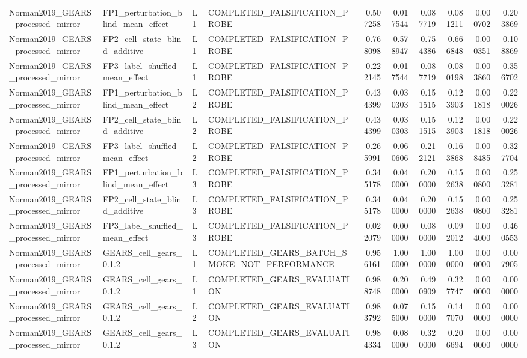 \begin{tabular}{llllrrrrrr}
Norman2019_GEARS_processed_mirror & FP1_perturbation_blind_mean_effect & L1 & COMPLETED_FALSIFICATION_PROBE & 0.507258 & 0.017544 & 0.087719 & 0.081211 & 0.000702 & 0.203869 \\
Norman2019_GEARS_processed_mirror & FP2_cell_state_blind_additive & L1 & COMPLETED_FALSIFICATION_PROBE & 0.768098 & 0.578947 & 0.754386 & 0.666848 & 0.000351 & 0.108869 \\
Norman2019_GEARS_processed_mirror & FP3_label_shuffled_mean_effect & L1 & COMPLETED_FALSIFICATION_PROBE & 0.222145 & 0.017544 & 0.087719 & 0.080198 & 0.003860 & 0.356702 \\
Norman2019_GEARS_processed_mirror & FP1_perturbation_blind_mean_effect & L2 & COMPLETED_FALSIFICATION_PROBE & 0.434399 & 0.030303 & 0.151515 & 0.123903 & 0.001818 & 0.220026 \\
Norman2019_GEARS_processed_mirror & FP2_cell_state_blind_additive & L2 & COMPLETED_FALSIFICATION_PROBE & 0.434399 & 0.030303 & 0.151515 & 0.123903 & 0.001818 & 0.220026 \\
Norman2019_GEARS_processed_mirror & FP3_label_shuffled_mean_effect & L2 & COMPLETED_FALSIFICATION_PROBE & 0.265991 & 0.060606 & 0.212121 & 0.163868 & 0.008485 & 0.327704 \\
Norman2019_GEARS_processed_mirror & FP1_perturbation_blind_mean_effect & L3 & COMPLETED_FALSIFICATION_PROBE & 0.345178 & 0.040000 & 0.200000 & 0.152638 & 0.000800 & 0.253281 \\
Norman2019_GEARS_processed_mirror & FP2_cell_state_blind_additive & L3 & COMPLETED_FALSIFICATION_PROBE & 0.345178 & 0.040000 & 0.200000 & 0.152638 & 0.000800 & 0.253281 \\
Norman2019_GEARS_processed_mirror & FP3_label_shuffled_mean_effect & L3 & COMPLETED_FALSIFICATION_PROBE & 0.022079 & 0.000000 & 0.080000 & 0.092012 & 0.004000 & 0.460553 \\
Norman2019_GEARS_processed_mirror & GEARS_cell_gears_0.1.2 & L1 & COMPLETED_GEARS_BATCH_SMOKE_NOT_PERFORMANCE & 0.956161 & 1.000000 & 1.000000 & 1.000000 & 0.000000 & 0.007905 \\
Norman2019_GEARS_processed_mirror & GEARS_cell_gears_0.1.2 & L1 & COMPLETED_GEARS_EVALUATION & 0.988748 & 0.200000 & 0.490909 & 0.327747 & 0.000000 & 0.000000 \\
Norman2019_GEARS_processed_mirror & GEARS_cell_gears_0.1.2 & L2 & COMPLETED_GEARS_EVALUATION & 0.983792 & 0.075000 & 0.150000 & 0.147070 & 0.000000 & 0.000000 \\
Norman2019_GEARS_processed_mirror & GEARS_cell_gears_0.1.2 & L3 & COMPLETED_GEARS_EVALUATION & 0.984334 & 0.080000 & 0.320000 & 0.206694 & 0.000000 & 0.000000 \\
\bottomrule
\end{tabular}

